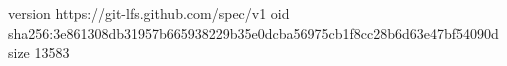 version https://git-lfs.github.com/spec/v1
oid sha256:3e861308db31957b665938229b35e0dcba56975cb1f8cc28b6d63e47bf54090d
size 13583
